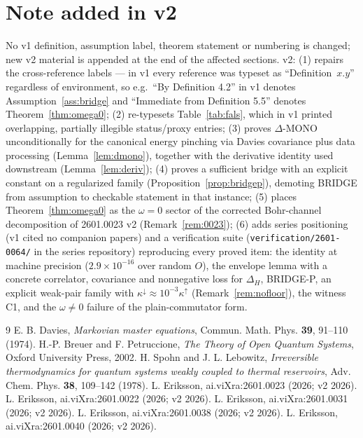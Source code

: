 \documentclass[11pt]{article}
\theoremstyle{definition}
\theoremstyle{remark}
\begin{document}
\section*{Note added in v2}
No v1 definition, assumption label, theorem statement or numbering is
changed; new v2 material is appended at the end of the affected sections.
v2: (1) repairs the cross-reference labels --- in v1 every reference was
typeset as ``Definition~$x.y$'' regardless of environment, so e.g.\ ``By
Definition 4.2'' in v1 denotes Assumption~\ref{ass:bridge} and
``Immediate from Definition 5.5'' denotes Theorem~\ref{thm:omega0}; (2)
re-typesets Table~\ref{tab:fals}, which in v1 printed overlapping,
partially illegible status/proxy entries; (3) proves $\Delta$-MONO
unconditionally for the canonical energy pinching via Davies covariance
plus data processing (Lemma~\ref{lem:dmono}), together with the
derivative identity used downstream (Lemma~\ref{lem:deriv}); (4) proves a
sufficient bridge with an explicit constant on a regularized family
(Proposition~\ref{prop:bridgep}), demoting BRIDGE from assumption to
checkable statement in that instance; (5) places
Theorem~\ref{thm:omega0} as the $\omega = 0$ sector of the corrected
Bohr-channel decomposition of 2601.0023 v2 (Remark~\ref{rem:0023}); (6)
adds series positioning (v1 cited no companion papers) and a verification
suite (\texttt{verification/2601-0064/} in the series repository)
reproducing every proved item: the identity at machine precision
($2.9\times10^{-16}$ over random $O$), the envelope lemma with a concrete
correlator, covariance and nonnegative loss for $\Delta_H$, BRIDGE-P, an
explicit weak-pair family with $\kappa^{\downarrow} \approx
10^{-3}\kappa^{\uparrow}$ (Remark~\ref{rem:nofloor}), the witness C1, and
the $\omega \ne 0$ failure of the plain-commutator form.

\begin{thebibliography}{9}
 E. B. Davies, \emph{Markovian master equations},
Commun. Math. Phys. \textbf{39}, 91--110 (1974).
 H.-P. Breuer and F. Petruccione, \emph{The Theory of Open
Quantum Systems}, Oxford University Press, 2002.
 H. Spohn and J. L. Lebowitz, \emph{Irreversible
thermodynamics for quantum systems weakly coupled to thermal reservoirs},
Adv. Chem. Phys. \textbf{38}, 109--142 (1978).
 L. Eriksson, ai.viXra:2601.0023 (2026; v2 2026).
 L. Eriksson, ai.viXra:2601.0022 (2026; v2 2026).
 L. Eriksson, ai.viXra:2601.0031 (2026; v2 2026).
 L. Eriksson, ai.viXra:2601.0038 (2026; v2 2026).
 L. Eriksson, ai.viXra:2601.0040 (2026; v2 2026).
\end{thebibliography}
\end{document}
